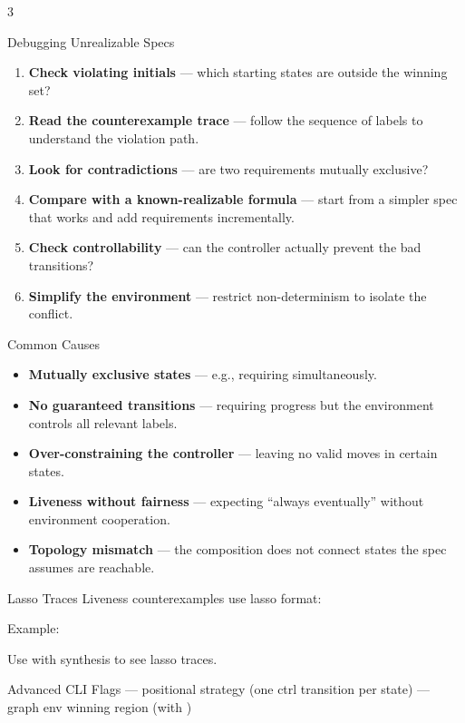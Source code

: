 \begin{multicols}{3}
\begin{tipbox}{Debugging Unrealizable Specs}
\begin{enumerate}[leftmargin=*]
  \item \textbf{Check violating initials} --- which starting states are outside the winning set?
  \item \textbf{Read the counterexample trace} --- follow the sequence of labels to understand the violation path.
  \item \textbf{Look for contradictions} --- are two requirements mutually exclusive?
  \item \textbf{Compare with a known-realizable formula} --- start from a simpler spec that works and add requirements incrementally.
  \item \textbf{Check controllability} --- can the controller actually prevent the bad transitions?
  \item \textbf{Simplify the environment} --- restrict non-determinism to isolate the conflict.
\end{enumerate}
\end{tipbox}

\begin{warnbox}{Common Causes}
\begin{itemize}
  \item \textbf{Mutually exclusive states} --- e.g., requiring  simultaneously.
  \item \textbf{No guaranteed transitions} --- requiring progress but the environment controls all relevant labels.
  \item \textbf{Over-constraining the controller} --- leaving no valid moves in certain states.
  \item \textbf{Liveness without fairness} --- expecting ``always eventually'' without environment cooperation.
  \item \textbf{Topology mismatch} --- the composition does not connect states the spec assumes are reachable.
\end{itemize}
\end{warnbox}

\begin{tipbox}{Lasso Traces}
Liveness counterexamples use lasso format:

Example: 

Use  with synthesis to see lasso traces.
\end{tipbox}

\begin{cheatbox}{Advanced CLI Flags}
 --- positional strategy (one ctrl transition per state)
 --- graph env winning region (with )
\end{cheatbox}

\end{multicols}


